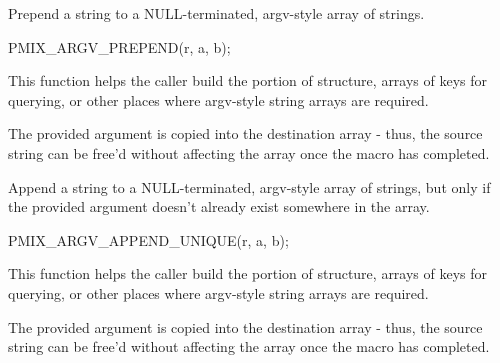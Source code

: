 
Prepend a string to a NULL-terminated, argv-style array of strings.

\cspecificstart
\begin{codepar}
PMIX_ARGV_PREPEND(r, a, b);
\end{codepar}
\cspecificend

\begin{arglist}
\end{arglist}

This function helps the caller build the  portion of  structure, arrays of keys for querying, or other places where argv-style string arrays are required.

\adviceuserstart
The provided argument is copied into the destination array - thus, the source string can be free'd without affecting the array once the macro has completed.
\adviceuserend


Append a string to a NULL-terminated, argv-style array of strings, but only if the provided argument doesn't already exist somewhere in the array.

\cspecificstart
\begin{codepar}
PMIX_ARGV_APPEND_UNIQUE(r, a, b);
\end{codepar}
\cspecificend

\begin{arglist}
\end{arglist}

This function helps the caller build the  portion of  structure, arrays of keys for querying, or other places where argv-style string arrays are required.

\adviceuserstart
The provided argument is copied into the destination array - thus, the source string can be free'd without affecting the array once the macro has completed.
\adviceuserend

